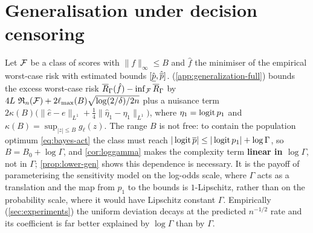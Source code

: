 \section{Generalisation under decision censoring}
\label{sec:generalization}

Let $\mathcal{F}$ be a class of scores with $\|f\|_\infty\le B$ and $\hat f$ the
minimiser of the empirical worst-case risk with estimated bounds
$[\hat{\underline{p}},\hat{\overline{p}}]$.  (\cref{app:generalization-full})
bounds the excess worst-case risk
$\overline{R}_\Gamma(\hat f)-\inf_{\mathcal{F}}\overline{R}_\Gamma$ by
$4L\,\operatorname{\mathfrak{R}}_n(\mathcal{F})+2\ell_{\max}(B)\sqrt{\log(2/\delta)/2n}$ plus a nuisance term
$2\kappa(B)\big(\|\hat e-e\|_{L^1}+\tfrac14\|\hat\eta_1-\eta_1\|_{L^1}\big)$,
where $\eta_1=\operatorname{logit} p_1$ and $\kappa(B)=\sup_{|z|\le B}g_\ell(z)$. The range
$B$ is not free: to contain the population optimum \eqref{eq:bayes-act} the
class must reach $|\operatorname{logit}\overline{p}|\le|\operatorname{logit} p_1|+\log\Gamma$, so
$B=B_0+\log\Gamma$, and \cref{cor:loggamma} makes the complexity term
\textbf{linear in $\log\Gamma$}, not in $\Gamma$; \cref{prop:lower-gen} shows
this dependence is necessary. It is the payoff of parameterising the
sensitivity model on the log-odds scale, where $\Gamma$ acts as a translation
and the map from $p_1$ to the bounds is $1$-Lipschitz, rather than on the
probability scale, where it would have Lipschitz constant $\Gamma$.
Empirically (\cref{sec:experiments}) the uniform deviation decays at the
predicted $n^{-1/2}$ rate and its coefficient is far better explained by
$\log\Gamma$ than by $\Gamma$.
